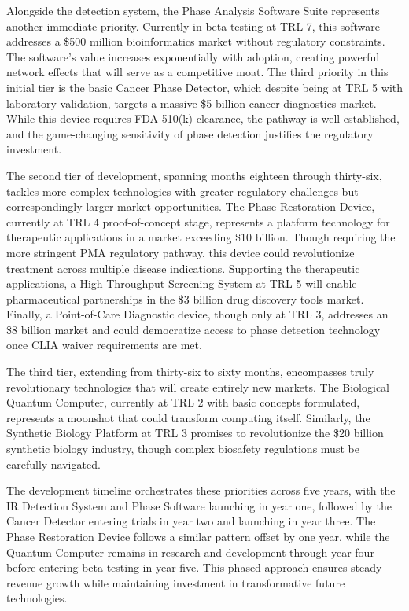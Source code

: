 \documentclass[12pt,a4paper]{report}
\begin{document}
Alongside the detection system, the Phase Analysis Software Suite represents another immediate priority. Currently in beta testing at TRL 7, this software addresses a \$500 million bioinformatics market without regulatory constraints. The software's value increases exponentially with adoption, creating powerful network effects that will serve as a competitive moat. The third priority in this initial tier is the basic Cancer Phase Detector, which despite being at TRL 5 with laboratory validation, targets a massive \$5 billion cancer diagnostics market. While this device requires FDA 510(k) clearance, the pathway is well-established, and the game-changing sensitivity of phase detection justifies the regulatory investment.

The second tier of development, spanning months eighteen through thirty-six, tackles more complex technologies with greater regulatory challenges but correspondingly larger market opportunities. The Phase Restoration Device, currently at TRL 4 proof-of-concept stage, represents a platform technology for therapeutic applications in a market exceeding \$10 billion. Though requiring the more stringent PMA regulatory pathway, this device could revolutionize treatment across multiple disease indications. Supporting the therapeutic applications, a High-Throughput Screening System at TRL 5 will enable pharmaceutical partnerships in the \$3 billion drug discovery tools market. Finally, a Point-of-Care Diagnostic device, though only at TRL 3, addresses an \$8 billion market and could democratize access to phase detection technology once CLIA waiver requirements are met.

The third tier, extending from thirty-six to sixty months, encompasses truly revolutionary technologies that will create entirely new markets. The Biological Quantum Computer, currently at TRL 2 with basic concepts formulated, represents a moonshot that could transform computing itself. Similarly, the Synthetic Biology Platform at TRL 3 promises to revolutionize the \$20 billion synthetic biology industry, though complex biosafety regulations must be carefully navigated.

The development timeline orchestrates these priorities across five years, with the IR Detection System and Phase Software launching in year one, followed by the Cancer Detector entering trials in year two and launching in year three. The Phase Restoration Device follows a similar pattern offset by one year, while the Quantum Computer remains in research and development through year four before entering beta testing in year five. This phased approach ensures steady revenue growth while maintaining investment in transformative future technologies.
\end{document}
